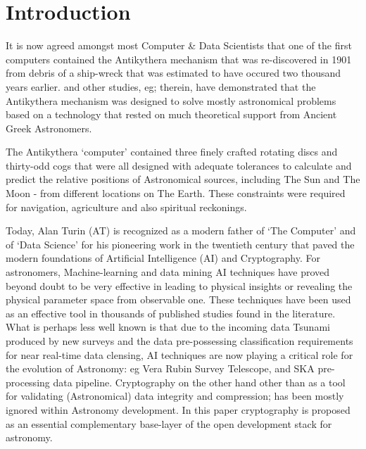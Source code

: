 \documentclass[final,5p,times,twocolumn,authoryear]{elsarticle}
\begin{document}

    

\section{Introduction}
\label{sec:intro}
%
 It is now agreed amongst most Computer \& Data Scientists that one of the first computers contained the Antikythera mechanism that was re-discovered in 1901 from debris of a ship-wreck that was estimated to have occured two thousand years earlier. \citet{Freeth2021} and other studies, eg; therein, have demonstrated that the Antikythera mechanism was designed to solve mostly astronomical problems based on a technology that rested on much theoretical support from Ancient Greek Astronomers. 
 
 The Antikythera `computer' contained three finely crafted rotating discs and thirty-odd cogs that were all designed with adequate tolerances to calculate and predict the relative positions of Astronomical sources, including The Sun and The Moon - from different locations on The Earth. These constraints were required for navigation, agriculture and also spiritual reckonings. 
 
 Today, Alan Turin (AT) is recognized as a modern father of `The Computer' and of `Data Science' for his pioneering work in the twentieth century that paved the modern foundations of Artificial Intelligence (AI) and Cryptography. For astronomers, Machine-learning and data mining AI techniques have proved beyond doubt to be very effective in leading to physical insights or revealing the physical parameter space from observable one. These techniques have been used as an effective tool in thousands of published studies found in the literature. What is perhaps less well known is that due to the incoming data Tsunami produced by new surveys and the data pre-possessing classification requirements for near real-time data clensing, AI techniques are now playing a critical role for the evolution of Astronomy: eg Vera Rubin Survey Telescope, and SKA pre-processing data pipeline. Cryptography on the other hand other than as a tool for validating (Astronomical) data integrity and compression; has been mostly ignored within Astronomy development. In this paper cryptography is proposed as an essential complementary base-layer of the open development stack for astronomy. 
\end{document}
